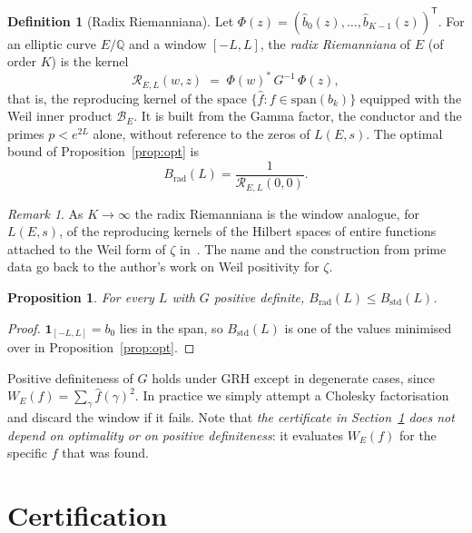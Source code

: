 \documentclass[11pt]{amsart}
\newtheorem{proposition}[theorem]{Proposition}
\theoremstyle{remark}
\newtheorem{remark}[theorem]{Remark}
\theoremstyle{definition}
\newtheorem{definition}[theorem]{Definition}
\newcommand{\Q}{\mathbb{Q}}
\begin{document}
\begin{definition}[Radix Riemanniana]\label{def:radix}
Let $\Phi(z)=(\hat b_0(z),\dots,\hat b_{K-1}(z))^{\mathsf T}$. For an elliptic curve $E/\Q$ and a window $[-L,L]$, the \emph{radix Riemanniana} of $E$ (of order $K$) is the kernel
\[
\mathcal R_{E,L}(w,z)\;=\;\Phi(w)^{\ast}\,G^{-1}\,\Phi(z),
\]
that is, the reproducing kernel of the space $\{\hat f: f\in\mathrm{span}(b_k)\}$ equipped with the Weil inner product $\mathcal B_E$. It is built from the Gamma factor, the conductor and the primes $p<e^{2L}$ alone, without reference to the zeros of $L(E,s)$. The optimal bound of Proposition~\ref{prop:opt} is
\[
B_{\mathrm{rad}}(L)=\frac{1}{\mathcal R_{E,L}(0,0)}.
\]
\end{definition}

\begin{remark}
As $K\to\infty$ the radix Riemanniana is the window analogue, for $L(E,s)$, of the reproducing kernels of the Hilbert spaces of entire functions attached to the Weil form of $\zeta$ in~\cite{Suzuki}. The name and the construction from prime data go back to the author's work on Weil positivity for $\zeta$.
\end{remark}

\begin{proposition}\label{prop:dominate}
For every $L$ with $G$ positive definite, $B_{\mathrm{rad}}(L)\le B_{\mathrm{std}}(L)$.
\end{proposition}
\begin{proof}
$\mathbf 1_{[-L,L]}=b_0$ lies in the span, so $B_{\mathrm{std}}(L)$ is one of the values minimised over in Proposition~\ref{prop:opt}.
\end{proof}

Positive definiteness of $G$ holds under GRH except in degenerate cases, since $W_E(f)=\sum_\gamma\hat f(\gamma)^2$. In practice we simply attempt a Cholesky factorisation and discard the window if it fails. Note that \emph{the certificate in Section~\ref{sec:cert} does not depend on optimality or on positive definiteness}: it evaluates $W_E(f)$ for the specific $f$ that was found.

\section{Certification}\label{sec:cert}
\end{document}
